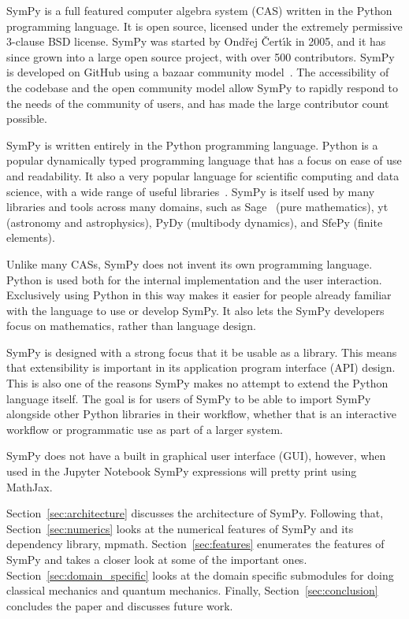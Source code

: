 SymPy is a full featured computer algebra system (CAS) written in the Python
programming language. It is open source, licensed under the extremely
permissive 3-clause BSD license.
SymPy was started by Ond\v{r}ej \v{C}ert\'{\i}k in 2005, and it has since
grown into a large open source project, with over 500 contributors. SymPy is
developed on GitHub using a bazaar community
model~\cite{raymond1999cathedral}. The accessibility of the codebase and the
open community model allow SymPy to rapidly respond to the needs of the
community of users, and has made the large contributor count possible.

SymPy is written entirely in the Python programming language.
Python is a popular dynamically typed programming language that has a focus on
ease of use and readability. It also a very popular language for scientific
computing and data science, with a wide range of useful
libraries~\cite{oliphant2007python}. SymPy is itself used by many libraries
and tools across many domains, such as Sage~\cite{SAGE} (pure mathematics), yt
(astronomy and astrophysics), PyDy (multibody dynamics), and SfePy (finite
elements).


Unlike many CASs, SymPy does not invent its own programming language. Python
is used both for the internal implementation and the user interaction.
Exclusively using Python in this way makes it easier for people already
familiar with the language to use or develop SymPy. It also lets the SymPy
developers focus on mathematics, rather than language design.

SymPy is designed with a strong focus that it be usable as a library. This
means that extensibility is important in its application program interface
(API) design. This is also one of the reasons SymPy makes no attempt to extend
the Python language itself. The goal is for users of SymPy to be able to
import SymPy alongside other Python libraries in their workflow, whether that
is an interactive workflow or programmatic use as part of a larger system.

SymPy does not have a built in graphical user interface (GUI), however, when
used in the Jupyter Notebook
SymPy expressions will pretty print using MathJax.

Section~\ref{sec:architecture} discusses the architecture of SymPy. Following
that, Section~\ref{sec:numerics} looks at the numerical features of SymPy and
its dependency library, mpmath. Section~\ref{sec:features} enumerates the
features of SymPy and takes a closer look at some of the important ones.
Section~\ref{sec:domain_specific} looks at the domain specific submodules for
doing classical mechanics and quantum mechanics. Finally,
Section~\ref{sec:conclusion} concludes the paper and discusses future work.
